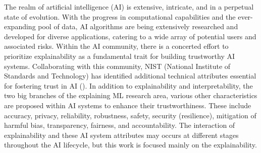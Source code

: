 \documentclass[binding=0.6cm]{sapthesis}
\newcommand{\mycite}[1]{(\cite{#1})}
\begin{document}
The realm of artificial intelligence (AI) is extensive, intricate, and in a perpetual state of evolution. With the progress in computational capabilities and the ever-expanding pool of data, AI algorithms are being extensively researched and developed for diverse applications, catering to a wide array of potential users and associated risks. Within the AI community, there is a concerted effort to prioritize explainability as a fundamental trait for building trustworthy AI systems. Collaborating with this community, NIST (National Institute of Standards and Technology) has identified additional technical attributes essential for fostering trust in AI \mycite{phillips2021-nist-xai}. In addition to explainability and interpretability, the two big branches of the explaining ML research area, various other characteristics are proposed within AI systems to enhance their trustworthiness. These include accuracy, privacy, reliability, robustness, safety, security (resilience), mitigation of harmful bias, transparency, fairness, and accountability. The interaction of explainability and these AI system attributes may occurs at different stages throughout the AI lifecycle, but this work is focused mainly on the explainability.
\end{document}
